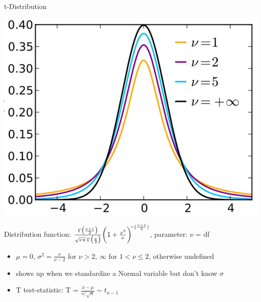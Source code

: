 \documentclass{beamer}
\begin{document}
\begin{frame}{t-Distribution}
\begin{center}
    \includegraphics[scale=.35]{img/t-distribution.jpg}
\end{center}
Distribution function: $\frac{\Gamma\bigl(\frac{\nu+1}{2}\bigr)}{%
   \sqrt{\nu\pi}\,\Gamma\bigl(\frac{\nu}{2}\bigr)}
   \biggl(1+\frac{x^2}{\nu}\biggr)^{\!\!-(\frac{\nu+1}{2})}$, parameter: $\nu$ = df
\begin{itemize}
    \item $\mu = 0$, $\sigma^2 = \frac{\nu}{\nu-2}$ for $\nu > 2$, $\infty$ for $1 < \nu \leq 2$, otherwise undefined
    \item shows up when we standardize a Normal variable but don't know $\sigma$
    \item T test-statistic: T = $\frac{\overline{x}-\mu}{s / \sqrt{n}} \sim t_{n-1}$
\end{itemize}
\end{frame}
\end{document}
